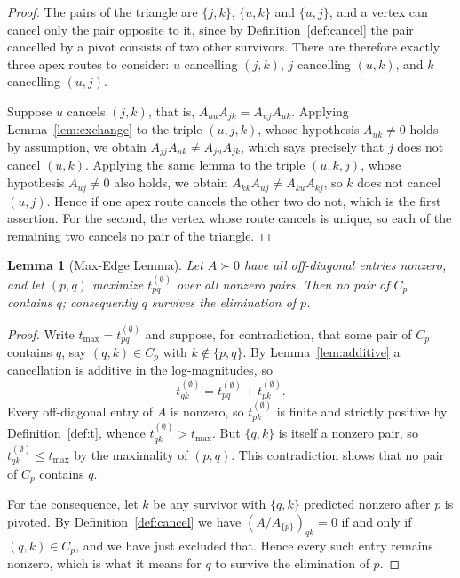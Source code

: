 \documentclass[11pt]{article}
\theoremstyle{plain}
\newtheorem{lemma}[theorem]{Lemma}
\theoremstyle{definition}
\begin{document}
\begin{humanblock}
\begin{proof}
The pairs of the triangle are $\{j,k\}$, $\{u,k\}$ and $\{u,j\}$, and a vertex can cancel only the pair
opposite to it, since by Definition~\ref{def:cancel} the pair cancelled by a pivot consists of two
other survivors. There are therefore exactly three apex routes to consider: $u$ cancelling $(j,k)$,
$j$ cancelling $(u,k)$, and $k$ cancelling $(u,j)$.

Suppose $u$ cancels $(j,k)$, that is, $A_{uu}A_{jk}=A_{uj}A_{uk}$. Applying
Lemma~\ref{lem:exchange} to the triple $(u,j,k)$, whose hypothesis $A_{uk}\neq0$ holds by assumption,
we obtain $A_{jj}A_{uk}\neq A_{ju}A_{jk}$, which says precisely that $j$ does not cancel $(u,k)$.
Applying the same lemma to the triple $(u,k,j)$, whose hypothesis $A_{uj}\neq0$ also holds, we obtain
$A_{kk}A_{uj}\neq A_{ku}A_{kj}$, so $k$ does not cancel $(u,j)$. Hence if one apex route cancels the
other two do not, which is the first assertion. For the second, the vertex whose route cancels is
unique, so each of the remaining two cancels no pair of the triangle.
\end{proof}

\begin{lemma}[Max-Edge Lemma]\label{lem:maxedge}
Let $A\succ0$ have all off-diagonal entries nonzero, and let $(p,q)$ maximize $t^{(\emptyset)}_{pq}$
over all nonzero pairs. Then no pair of $C_p$ contains $q$; consequently $q$ survives the elimination
of $p$.
\end{lemma}

\begin{proof}
Write $t_{\max}=t^{(\emptyset)}_{pq}$ and suppose, for contradiction, that some pair of $C_p$ contains
$q$, say $(q,k)\in C_p$ with $k\notin\{p,q\}$. By Lemma~\ref{lem:additive} a cancellation is additive
in the log-magnitudes, so
\[
  t^{(\emptyset)}_{qk}=t^{(\emptyset)}_{pq}+t^{(\emptyset)}_{pk}.
\]
Every off-diagonal entry of $A$ is nonzero, so $t^{(\emptyset)}_{pk}$ is finite and strictly positive
by Definition~\ref{def:t}, whence $t^{(\emptyset)}_{qk}>t_{\max}$. But $\{q,k\}$ is itself a nonzero
pair, so $t^{(\emptyset)}_{qk}\le t_{\max}$ by the maximality of $(p,q)$. This contradiction shows
that no pair of $C_p$ contains $q$.

For the consequence, let $k$ be any survivor with $\{q,k\}$ predicted nonzero after $p$ is pivoted. By
Definition~\ref{def:cancel} we have $(A/A_{\{p\}})_{qk}=0$ if and only if $(q,k)\in C_p$, and we have
just excluded that. Hence every such entry remains nonzero, which is what it means for $q$ to survive
the elimination of $p$.
\end{proof}


\end{humanblock}
\end{document}
